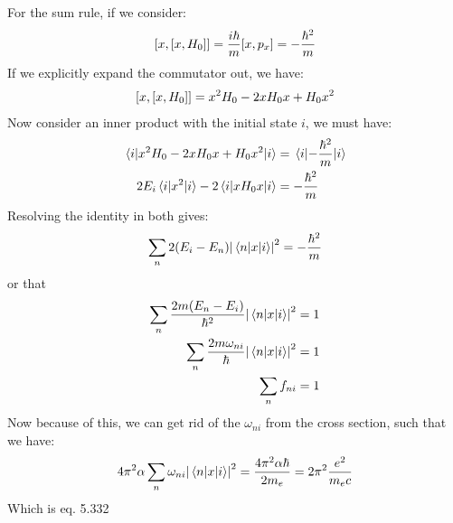 \documentclass[12pt]{article}
\begin{document}
For the sum rule, if we consider:
\begin{align*}
  \comm{x}{\comm{x}{H_0}}=\frac{i\hbar}{m}\comm{x}{p_x}=-\frac{\hbar^2}{m}
\end{align*}
If we explicitly expand the commutator out, we have:
\begin{align*}
  \comm{x}{\comm{x}{H_0}}=x^2H_0-2xH_0x+H_0x^2
\end{align*}
Now consider an inner product with the initial state $i$, we must have:
\begin{align*}
  \mel{i}{x^2H_0-2xH_0x+H_0x^2}{i}&=\mel{i}{-\frac{\hbar^2}{m}}{i}\\
  2E_i\mel{i}{x^2}{i}-2\mel{i}{xH_0x}{i}&=-\frac{\hbar^2}m
\end{align*}
Resolving the identity in both gives:
\begin{align*}
  \sum_n2(E_i-E_n)\abs{\mel{n}{x}{i}}^2=-\frac{\hbar^2}{m}
\end{align*}
or that
\begin{align*}
  \sum_n\frac{2m(E_n-E_i)}{\hbar^2}\abs{\mel{n}{x}{i}}^2&=1\\
  \sum_n\frac{2m\omega_{ni}}{\hbar}\abs{\mel{n}{x}{i}}^2&=1\\
  \sum_nf_{ni}&=1
\end{align*}
Now because of this, we can get rid of the $\omega_{ni}$ from the cross section, such that we have:
\begin{align*}
  4\pi^2\alpha\sum_{n}\omega_{ni}\abs{\mel{n}{x}{i}}^2=
  \frac{4\pi^2\alpha\hbar}{2m_e}=2\pi^2\frac{e^2}{m_ec}
\end{align*}
Which is eq. 5.332
\end{document}
